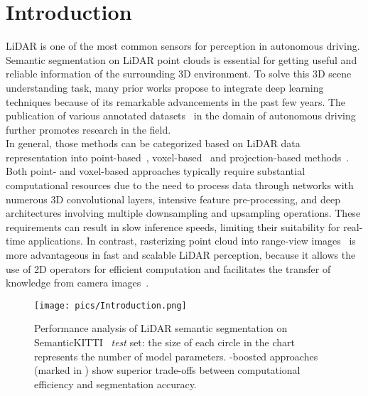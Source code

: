 \section{Introduction}
\label{sec:intro}
LiDAR is one of the most common sensors for perception in autonomous driving. Semantic segmentation on LiDAR point clouds is essential for getting useful and reliable information of the surrounding 3D environment. To solve this 3D scene understanding task, many prior works propose to integrate deep learning techniques because of its remarkable advancements in the past few years. The publication of various annotated datasets~\cite{geiger2012we, caesar2020nuscenes, sun2020scalability} in the domain of autonomous driving further promotes research in the field.\\
In general, those methods can be categorized based on LiDAR data representation into point-based~\cite{zhao2021point, qi2017pointnet++, wu2024ptv3}, voxel-based~\cite{zhou2020cylinder3d, hong2022dynamic} and projection-based methods~\cite{zhang2020polarnet, 2019rangenet++, cheng2022cenet, zhao2021fidnet}. Both point- and voxel-based approaches typically require substantial computational resources due to the need to process data through networks with numerous 3D convolutional layers, intensive feature pre-processing, and deep architectures involving multiple downsampling and upsampling operations. These requirements can result in slow inference speeds, limiting their suitability for real-time applications. In contrast, rasterizing point cloud into range-view images~\cite{cortinhal2020salsanext} is more advantageous in fast and scalable LiDAR perception, because it allows the use of 2D operators for efficient computation and facilitates the transfer of knowledge from camera images~\cite{ando2023rangevit, kong2023rethinking}.
\begin{figure}[t]
  \centering
    \texttt{[image: pics/Introduction.png]}
    \caption{Performance analysis of LiDAR semantic segmentation on SemanticKITTI~\cite{behley2019semantickitti} \textit{test} set: the size of each circle in the chart represents the number of model parameters. \coolname{}-boosted approaches (marked in \textcolor{orange}{\text{\faBolt}}) show superior trade-offs between computational efficiency and segmentation accuracy.}
    \label{fig:intro}
    \vspace{-7mm}
\end{figure}\\
